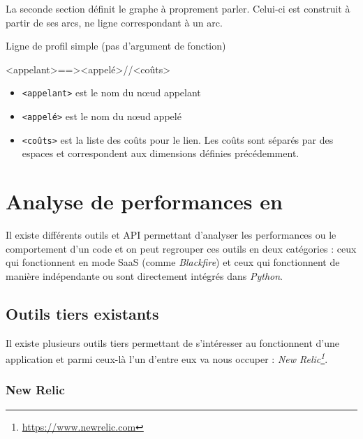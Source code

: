 La seconde section définit le graphe à proprement parler. Celui-ci est construit à partir de ses arcs, ne ligne correspondant à un arc.

\begin{listing}[H]
\caption{Ligne de profil simple (pas d'argument de fonction)}
\begin{textcode}
<appelant>==><appelé>//<coûts>
\end{textcode}
\end{listing}

\begin{itemize}
\item \verb|<appelant>| est le nom du nœud appelant
\item \verb|<appelé>| est le nom du nœud appelé
\item \verb|<coûts>| est la liste des coûts pour le lien. Les coûts sont séparés par des espaces et correspondent aux dimensions définies précédemment.
\end{itemize}

	\chapter[Analyse en \Python]{Analyse de performances en \Python}
Il existe différents outils et API permettant d'analyser les performances ou le comportement d'un code \Python et on peut regrouper ces outils en deux catégories : ceux qui fonctionnent en mode \gls{SaaS} (comme \emph{Blackfire}) et ceux qui fonctionnent de manière indépendante ou sont directement intégrés dans \emph{Python}.

		\section{Outils tiers existants}
Il existe plusieurs outils tiers permettant de s'intéresser au fonctionnent d'une application \Python et parmi ceux-là l'un d'entre eux va nous occuper : \emph{New Relic\footnote{\url{https://www.newrelic.com}}}. %

			\subsection{New Relic}
          		
			
